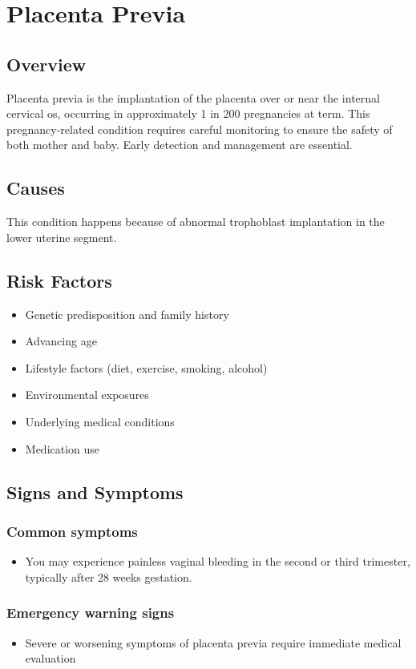 \chapter{Placenta Previa}
\label{sec:Placenta Previa}

\section{Overview}
Placenta previa is the implantation of the placenta over or near the internal cervical os, occurring in approximately 1 in 200 pregnancies at term. This pregnancy-related condition requires careful monitoring to ensure the safety of both mother and baby. Early detection and management are essential.
\section{Causes}
This condition happens because of abnormal trophoblast implantation in the lower uterine segment.     
\section{Risk Factors}

\begin{itemize}[noitemsep]
  \item Genetic predisposition and family history
  \item Advancing age
  \item Lifestyle factors (diet, exercise, smoking, alcohol)
  \item Environmental exposures
  \item Underlying medical conditions
  \item Medication use
\end{itemize}
\section{Signs and Symptoms}

\subsection{Common symptoms}
\begin{itemize}[noitemsep]
  \item You may experience painless vaginal bleeding in the second or third trimester, typically after 28 weeks gestation. 
  \end{itemize}

\subsection{Emergency warning signs}
\begin{itemize}[noitemsep]
  \item Severe or worsening symptoms of placenta previa require immediate medical evaluation
\end{itemize}
